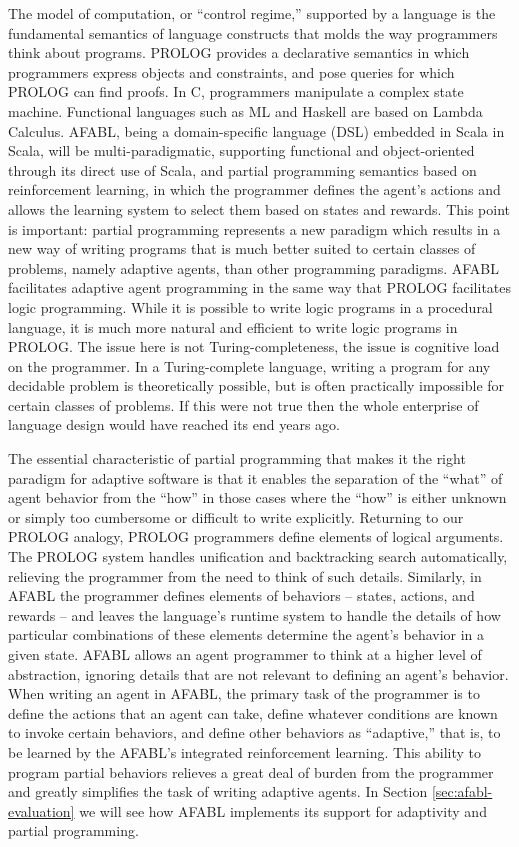 The model of computation, or ``control regime,'' supported by a language is the fundamental semantics of language constructs that molds the way programmers think about programs. PROLOG provides a declarative semantics in which programmers express objects and constraints, and pose queries for which PROLOG can find proofs.  In C, programmers manipulate a complex state machine. Functional languages such as ML and Haskell are based on Lambda Calculus. AFABL, being a domain-specific language (DSL) \cite{hudak1996building} embedded in Scala \cite{odersky2008programming,odersky2005scalable} in Scala, will be multi-paradigmatic, supporting functional and object-oriented through its direct use of Scala, and partial programming semantics based on reinforcement learning, in which the programmer defines the agent's actions and allows the learning system to select them based on states and rewards.  This point is important: partial programming represents a new paradigm which results in a new way of writing programs that is much better suited to certain classes of problems, namely adaptive agents, than other programming paradigms.  AFABL facilitates adaptive agent programming in the same way that PROLOG facilitates logic programming.  While it is possible to write logic programs in a procedural language, it is much more natural and efficient to write logic programs in PROLOG.  The issue here is not Turing-completeness, the issue is cognitive load on the programmer.  In a Turing-complete language, writing a program for any decidable problem is theoretically possible, but is often practically impossible for certain classes of problems.  If this were not true then the whole enterprise of language design would have reached its end years ago.

The essential characteristic of partial programming that makes it the right paradigm for adaptive software is that it enables the separation of the ``what'' of agent behavior from the ``how'' in those cases where the ``how'' is either unknown or simply too cumbersome or difficult to write explicitly.  Returning to our PROLOG analogy, PROLOG programmers define elements of logical arguments.  The PROLOG system handles unification and backtracking search automatically, relieving the programmer from the need to think of such details. Similarly, in AFABL the programmer defines elements of behaviors -- states, actions, and rewards -- and leaves the language's runtime system to handle the details of how particular combinations of these elements determine the agent's behavior in a given state.  AFABL allows an agent programmer to think at a higher level of abstraction, ignoring details that are not relevant to defining an agent's behavior.  When writing an agent in AFABL, the primary task of the programmer is to define the actions that an agent can take, define whatever conditions are known to invoke certain behaviors, and define other behaviors as ``adaptive,'' that is, to be learned by the AFABL's integrated reinforcement learning.  This ability to program partial behaviors relieves a great deal of burden from the programmer and greatly simplifies the task of writing adaptive agents.  In Section \ref{sec:afabl-evaluation} we will see how AFABL implements its support for adaptivity and partial programming.


